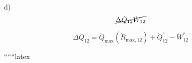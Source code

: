 d)
\[
\cancel{\Delta \dot{Q}_{12} \dot{W}_{12}}
\]

\[
\Delta \dot{Q}_{12} = \dot{Q}_{\text{max}} (\dot{R}_{\text{max},12}) + \dot{Q}_{12}^{\circ} - \dot{W}_{12}^{\circ}
\]

``````latex
